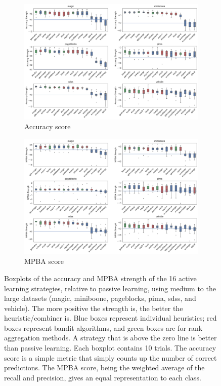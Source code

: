 \documentclass[fleqn,10pt,lineno]{wlpeerj} %
\begin{document}
\begin{figure}[tbp]
	\centering
	\begin{subfigure}[t]{\textwidth}
        \centering
        \includegraphics[width=\textwidth]{figures/strengths-accuracy-large}
		\caption{Accuracy score}
		\label{fig:strengths-mpba-small}
	\end{subfigure}
	\begin{subfigure}[t]{\textwidth}
        \centering
        \includegraphics[width=\textwidth]{figures/strengths-mpba-large}
		\caption{MPBA score}
		\label{fig:strengths-mpba-large}
    \end{subfigure}
	\caption[Policy strength]{Boxplots of the accuracy and MPBA strength of the
	16 active learning strategies, relative to passive learning, using medium
	to the large datasets (magic, miniboone, pageblocks, pima, sdss, and
	vehicle). The more positive the strength is, the better the
	heuristic/combiner is. Blue boxes represent individual heuristics; red
	boxes represent bandit algorithms, and green boxes are for rank aggregation
	methods. A strategy that is above the zero line is better than passive
	learning. Each boxplot contains 10 trials. The accuracy score is a simple
	metric that simply counts up the number of correct predictions. The MPBA
	score, being the weighted average of the recall and precision, gives an
	equal representation to each class.}
	\label{fig:strengths-large}
\end{figure}
\end{document}
